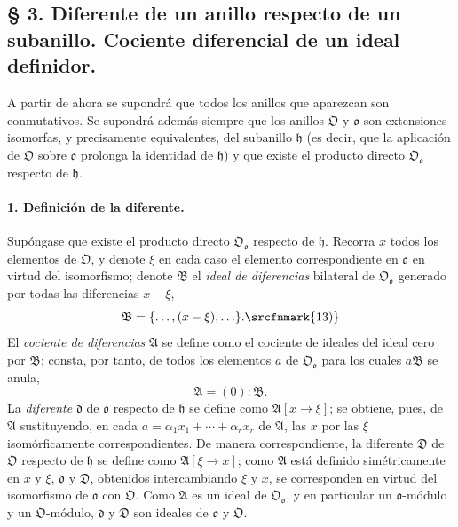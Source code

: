 \subsection*{§ 3. Diferente de un anillo respecto de un subanillo. Cociente diferencial de un ideal definidor.}

A partir de ahora se supondrá que todos los anillos que aparezcan son conmutativos. Se supondrá además siempre que los anillos $\mathfrak O$ y $\mathfrak o$ son extensiones isomorfas, y precisamente equivalentes, del subanillo $\mathfrak h$ (es decir, que la aplicación de $\mathfrak O$ sobre $\mathfrak o$ prolonga la identidad de $\mathfrak h$) y que existe el producto directo $\mathfrak O_{\mathfrak o}$ respecto de $\mathfrak h$.

\paragraph{1. Definición de la diferente.}
Supóngase que existe el producto directo $\mathfrak O_{\mathfrak o}$ respecto de $\mathfrak h$. Recorra $x$ todos los elementos de $\mathfrak O$, y denote $\xi$ en cada caso el elemento correspondiente en $\mathfrak o$ en virtud del isomorfismo; denote $\mathfrak B$ el \emph{ideal de diferencias} bilateral de $\mathfrak O_{\mathfrak o}$ generado por todas las diferencias $x-\xi$,
\[
\mathfrak B=\{\ldots,(x-\xi),\ldots\}.\srcfnmark{13)}
\]
El \emph{cociente de diferencias} $\mathfrak A$ se define como el cociente de ideales del ideal cero por $\mathfrak B$; consta, por tanto, de todos los elementos $a$ de $\mathfrak O_{\mathfrak o}$ para los cuales $a\mathfrak B$ se anula,
\[
\mathfrak A=(0):\mathfrak B.
\]
La \emph{diferente} $\mathfrak d$ de $\mathfrak o$ respecto de $\mathfrak h$ se define como $\mathfrak A[x\to\xi]$; se obtiene, pues, de $\mathfrak A$ sustituyendo, en cada $a=\alpha_1x_1+\cdots+\alpha_rx_r$ de $\mathfrak A$, las $x$ por las $\xi$ isomórficamente correspondientes. De manera correspondiente, la diferente $\mathfrak D$ de $\mathfrak O$ respecto de $\mathfrak h$ se define como $\mathfrak A[\xi\to x]$; como $\mathfrak A$ está definido simétricamente en $x$ y $\xi$, $\mathfrak d$ y $\mathfrak D$, obtenidos intercambiando $\xi$ y $x$, se corresponden en virtud del isomorfismo de $\mathfrak o$ con $\mathfrak O$. Como $\mathfrak A$ es un ideal de $\mathfrak O_{\mathfrak o}$, y en particular un $\mathfrak o$-módulo y un $\mathfrak O$-módulo, $\mathfrak d$ y $\mathfrak D$ son ideales de $\mathfrak o$ y $\mathfrak O$.

